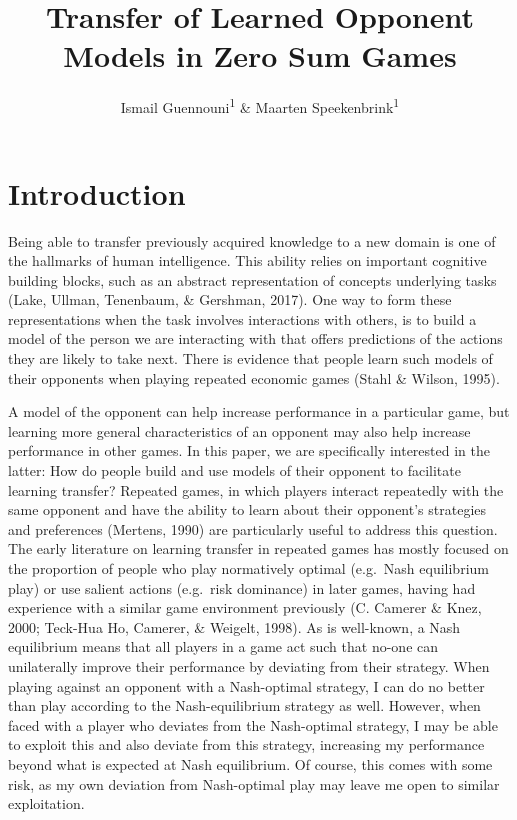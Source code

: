 \documentclass[
  english,
  man,floatsintext]{apa6}
\title{Transfer of Learned Opponent Models in Zero Sum Games}
\author{Ismail Guennouni\textsuperscript{1} \& Maarten Speekenbrink\textsuperscript{1}}
\date{}
\affiliation{\vspace{0.5cm}\textsuperscript{1} Department of Experimental Psychology, University College London}
\begin{document}
\maketitle

\hypertarget{introduction}{%
\section{Introduction}\label{introduction}}

Being able to transfer previously acquired knowledge to a new domain is one of the hallmarks of human intelligence. This ability relies on important cognitive building blocks, such as an abstract representation of concepts underlying tasks (Lake, Ullman, Tenenbaum, \& Gershman, 2017). One way to form these representations when the task involves interactions with others, is to build a model of the person we are interacting with that offers predictions of the actions they are likely to take next. There is evidence that people learn such models of their opponents when playing repeated economic games (Stahl \& Wilson, 1995).

A model of the opponent can help increase performance in a particular game, but learning more general characteristics of an opponent may also help increase performance in other games. In this paper, we are specifically interested in the latter: How do people build and use models of their opponent to facilitate learning transfer? Repeated games, in which players interact repeatedly with the same opponent and have the ability to learn about their opponent's strategies and preferences (Mertens, 1990) are particularly useful to address this question. The early literature on learning transfer in repeated games has mostly focused on the proportion of people who play normatively optimal (e.g.~Nash equilibrium play) or use salient actions (e.g.~risk dominance) in later games, having had experience with a similar game environment previously (C. Camerer \& Knez, 2000; Teck-Hua Ho, Camerer, \& Weigelt, 1998). As is well-known, a Nash equilibrium means that all players in a game act such that no-one can unilaterally improve their performance by deviating from their strategy. When playing against an opponent with a Nash-optimal strategy, I can do no better than play according to the Nash-equilibrium strategy as well. However, when faced with a player who deviates from the Nash-optimal strategy, I may be able to exploit this and also deviate from this strategy, increasing my performance beyond what is expected at Nash equilibrium. Of course, this comes with some risk, as my own deviation from Nash-optimal play may leave me open to similar exploitation.
\end{document}
